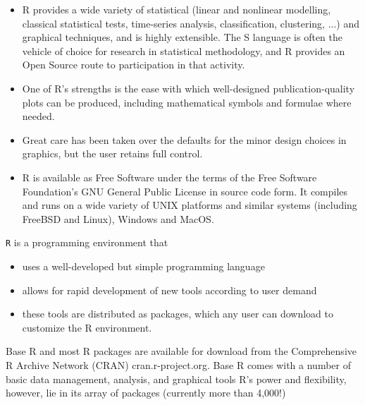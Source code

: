 \documentclass{beamer}
\begin{document}
	\begin{frame}
		\begin{itemize}
			\item R provides a wide variety of statistical (linear and nonlinear modelling, classical statistical tests,
			time-series analysis, classification, clustering, ...) and graphical techniques, and is highly extensible.
			The S language is often the vehicle of choice for research in statistical methodology,
			and R provides an Open Source route to participation in that activity.
			\item One of R’s strengths is the ease with which well-designed publication-quality plots can be
			produced, including mathematical symbols and formulae where needed. 
			\item Great care has been
			taken over the defaults for the minor design choices in graphics, but the user retains full control.
			\item R is available as Free Software under the terms of the Free Software Foundation’s GNU General
			Public License in source code form. It compiles and runs on a wide variety of UNIX platforms
			and similar systems (including FreeBSD and Linux), Windows and MacOS.
		\end{itemize}
	\end{frame}
	\begin{frame}
		
		\texttt{R} is a programming environment that
		\begin{itemize}
			\item uses a well-developed but simple programming language
			\item allows for rapid development of new tools according to user demand
			\item these tools are distributed as packages, which any user can download to customize the R
			environment.
			
		\end{itemize}
	\end{frame}
	\begin{frame}
		
		Base R and most R packages are available for download from the Comprehensive R Archive Network
		(CRAN) cran.r-project.org. Base R comes with a number of basic data management,
		analysis, and graphical tools R’s power and flexibility, however, lie in its array of packages
		(currently more than 4,000!)
	\end{frame}
\end{document}
